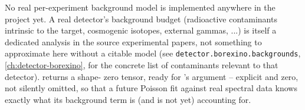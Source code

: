 
\begin{implbox}
No real per-experiment background model is implemented anywhere in the
project yet. A real detector's background budget (radioactive contaminants
intrinsic to the target, cosmogenic isotopes, external gammas, ...) is
itself a dedicated analysis in the source experimental papers, not something
to approximate here without a citable model (see
\texttt{detector.borexino.backgrounds}, \cref{ch:detector-borexino}, for the
concrete list of contaminants relevant to that detector).  returns a shape- zero
tensor, ready for 's
 argument -- explicit and zero, not silently
omitted, so that a future Poisson fit against real spectral data knows
exactly what its background term is (and is not yet) accounting for.
\end{implbox}
